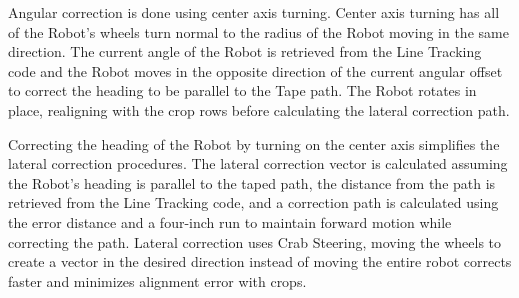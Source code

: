 \documentclass[11pt, twoside]{report}
\begin{document}
Angular correction is done using center axis turning. Center axis turning has all of the Robot’s wheels turn normal to the radius of the Robot moving in the same direction. The current angle of the Robot is retrieved from the Line Tracking code and the Robot moves in the opposite direction of the current angular offset to correct the heading to be parallel to the Tape path. The Robot rotates in place, realigning with the crop rows before calculating the lateral correction path.

Correcting the heading of the Robot by turning on the center axis simplifies the lateral correction procedures. The lateral correction vector is calculated assuming the Robot’s heading is parallel to the taped path, the distance from the path is retrieved from the Line Tracking code, and a correction path is calculated using the error distance and a four-inch run to maintain forward motion while correcting the path. Lateral correction uses Crab Steering, moving the wheels to create a vector in the desired direction instead of moving the entire robot corrects faster and minimizes alignment error with crops. 
\end{document}
